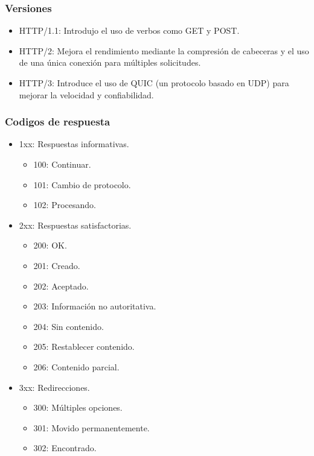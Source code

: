 \begin{center}
	\subsubsection{Versiones}
	\begin{itemize}
		\item HTTP/1.1: Introdujo el uso de verbos como GET y POST.
		\item HTTP/2: Mejora el rendimiento mediante la compresión de cabeceras y el uso de una única conexión para múltiples solicitudes.
		\item HTTP/3: Introduce el uso de QUIC (un protocolo basado en UDP) para mejorar la velocidad y confiabilidad.
	\end{itemize}

	\subsubsection{Codigos de respuesta}
	\begin{itemize}
		\item 1xx: Respuestas informativas.
		      \begin{itemize}
			      \item 100: Continuar.
			      \item 101: Cambio de protocolo.
			      \item 102: Procesando.
		      \end{itemize}
		\item 2xx: Respuestas satisfactorias.
		      \begin{itemize}
			      \item 200: OK.
			      \item 201: Creado.
			      \item 202: Aceptado.
			      \item 203: Información no autoritativa.
			      \item 204: Sin contenido.
			      \item 205: Restablecer contenido.
			      \item 206: Contenido parcial.
		      \end{itemize}
		\item 3xx: Redirecciones.
		      \begin{itemize}
			      \item 300: Múltiples opciones.
			      \item 301: Movido permanentemente.
			      \item 302: Encontrado.
		      \end{itemize}

\end{itemize}
\end{center}
